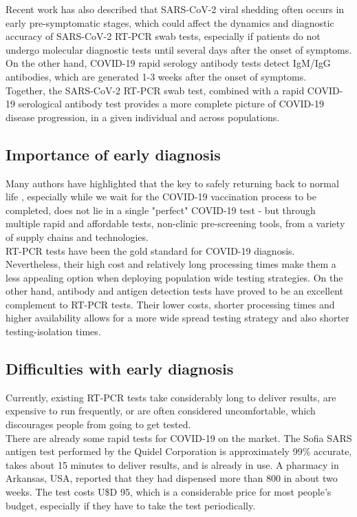 \documentclass{nle}
\begin{document}
Recent work has also described that SARS-CoV-2 viral shedding often occurs in early pre-symptomatic stages, which could affect the dynamics and diagnostic accuracy of SARS-CoV-2 RT-PCR swab tests, especially if patients do not undergo molecular diagnostic tests until several days after the onset of symptoms. On the other hand, COVID-19 rapid serology antibody tests detect IgM/IgG antibodies, which are generated 1-3 weeks after the onset of symptoms.\\

Together, the SARS-CoV-2 RT-PCR swab test, combined with a rapid COVID-19 serological antibody test provides a more complete picture of COVID-19 disease progression, in a given individual and across populations.

\subsection{Importance of early diagnosis}

Many authors have highlighted that the key to safely returning back to normal life \cite{35}, especially while we wait for the COVID-19 vaccination process to be completed, does not lie in a single "perfect" COVID-19 test - but through multiple rapid and affordable tests, non-clinic pre-screening tools, from a variety of supply chains and technologies.\\

RT-PCR tests have been the gold standard for COVID-19 diagnosis. Nevertheless, their high cost and relatively long processing times make them a less appealing option  when deploying population wide testing strategies. On the other hand, antibody and antigen detection tests have proved to be an excellent complement to RT-PCR tests. Their lower costs, shorter processing times and higher availability allows for a more wide spread testing strategy and also shorter testing-isolation times.

\subsection{Difficulties with early diagnosis}

Currently, existing RT-PCR tests take considerably long to deliver results, are expensive to run frequently, or are often considered uncomfortable, which discourages people from going to get tested.\\

There are already some rapid tests for COVID-19 on the market. The Sofia SARS antigen test performed by the Quidel Corporation is approximately 99\% accurate, takes about 15 minutes to deliver results, and is already in use. A pharmacy in Arkansas, USA, reported that they had dispensed more than 800 in about two weeks. The test costs U\$D 95, which is a considerable price for most people’s budget, especially if they have to take the test periodically.\\
\end{document}

